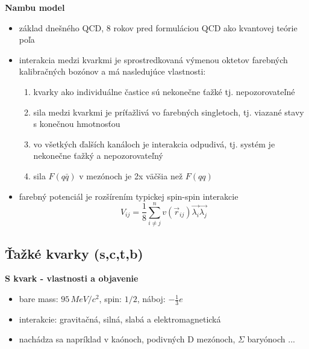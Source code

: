 \documentclass[../../main.tex]{subfiles}
\begin{document}
\textbf{Nambu model}
\begin{itemize}
\item základ dnešného QCD, 8 rokov pred formuláciou QCD ako kvantovej teórie poľa
\item interakcia medzi kvarkmi je sprostredkovaná výmenou oktetov farebných kalibračných bozónov a má nasledujúce vlastnosti:
\begin{enumerate}
\item kvarky ako individuálne častice sú nekonečne ťažké tj. nepozorovateľné
\item sila medzi kvarkmi je príťažlivá vo farebných singletoch, tj. viazané stavy s konečnou hmotnosťou
\item vo všetkých ďalších kanáloch je interakcia odpudivá, tj. systém je nekonečne ťažký a nepozorovateľný 
\item sila $F(q\bar{q})$ v mezónoch je 2x väčšia než $F(qq)$ 
\end{enumerate}
\item farebný potenciál je rozšírením typickej spin-spin interakcie
$$ V_{ij} = \frac{1}{8} \sum_{i \neq j}^{n} v(\vec{r}_{ij}) \vec{\lambda_{i}}\vec{\lambda_{j}} $$
\end{itemize}

\subsection{Ťažké kvarky (s,c,t,b)}
\textbf{S kvark - vlastnosti a objavenie}
\begin{itemize}
\item bare mass: $95\,\unit{MeV}/c^2$, spin: $1/2$, náboj: $-\frac{1}{3}e$ 
\item interakcie: gravitačná, silná, slabá a elektromagnetická
\item nachádza sa napríklad v kaónoch, podivných D mezónoch, $\Sigma$ baryónoch ...
\end{itemize}
\end{document}
